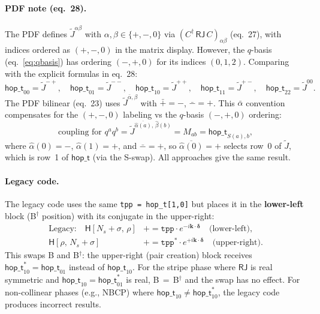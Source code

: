 \documentclass[11pt]{article}
\newcommand{\hop}{\mathsf{hop\_t}}
\newcommand{\Ns}{N_s}
\newcommand{\dg}{^\dagger}
\begin{document}
\paragraph{PDF note (eq.~28).}
The PDF defines $\tilde{J}^{\alpha\beta}$ with $\alpha,\beta \in \{+,-,0\}$
via $(C\dg\,\mathsf{RJ}\,C)_{\alpha\beta}$ (eq.~27), with indices
ordered as $(+,-,0)$ in the matrix display.  However, the $q$-basis
(eq.~\eqref{eq:qbasis}) has ordering $(-,+,0)$ for its indices $(0,1,2)$.
Comparing with the explicit formulas in eq.~28:
\begin{equation}
  \hop_{00} = \tilde{J}^{-+}, \quad
  \hop_{01} = \tilde{J}^{--}, \quad
  \hop_{10} = \tilde{J}^{++}, \quad
  \hop_{11} = \tilde{J}^{+-}, \quad
  \hop_{22} = \tilde{J}^{00}.
\end{equation}
The PDF bilinear (eq.~23) uses $\tilde{J}^{\bar\alpha,\beta}$ with
$\bar{+}=-$, $\bar{-}=+$.  This $\bar\alpha$ convention compensates
for the $(+,-,0)$ labeling vs the $q$-basis $(-, +, 0)$ ordering:
\begin{equation}
  \text{coupling for }q^a q^b
  = \tilde{J}^{\overline{\hat\alpha(a)},\,\hat\beta(b)}
  = M_{ab} = \hop_{S(a),b},
\end{equation}
where $\hat\alpha(0) = -$, $\hat\alpha(1) = +$, and $\bar{-} = +$, so
$\overline{\hat\alpha(0)} = +$ selects row~0 of $\tilde{J}$, which is
row~1 of $\hop$ (via the S-swap).  All approaches give the same result.

\paragraph{Legacy code.}
The legacy code uses the same \texttt{tpp = hop\_t[1,0]} but places
it in the \textbf{lower-left} block (B$\dg$ position) with its
conjugate in the upper-right:
\begin{align}
  \text{Legacy:}\quad
  \mathsf{H}[\Ns{+}\sigma,\,\rho] &\mathrel{+}= \texttt{tpp}\cdot e^{-i\mathbf{k}\cdot\bm\delta}
  \quad\text{(lower-left)},\\
  \mathsf{H}[\rho,\,\Ns{+}\sigma] &\mathrel{+}= \texttt{tpp}^*\cdot e^{+i\mathbf{k}\cdot\bm\delta}
  \quad\text{(upper-right)}.
\end{align}
This swaps B and B$\dg$: the upper-right (pair creation) block
receives $\hop_{10}^* = \hop_{01}$ instead of $\hop_{10}$.
For the stripe phase where $\mathsf{RJ}$ is real symmetric and
$\hop_{10} = \hop_{01}^*$ is real, B$\,{=}\,$B$\dg$ and the swap has
no effect.  For non-collinear phases (e.g., NBCP) where
$\hop_{10} \ne \hop_{10}^*$, the legacy code produces incorrect results.
\end{document}
